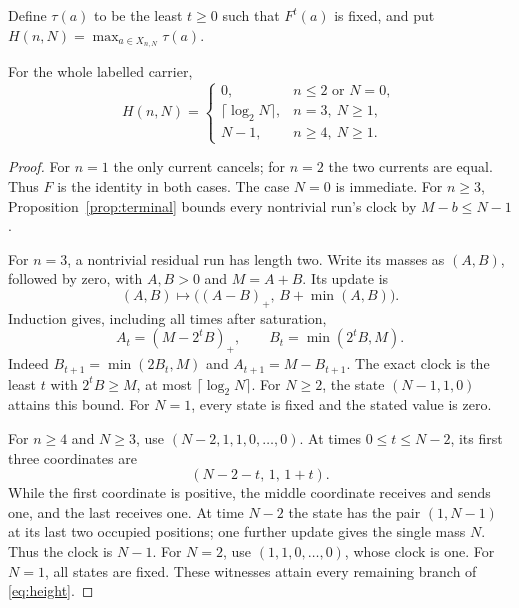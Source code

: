 Define $\tau(a)$ to be the least $t\ge0$ such that $F^t(a)$ is fixed, and
put $H(n,N)=\max_{a\in X_{n,N}}\tau(a)$.

\begin{theorem}\label{thm:clock}
For the whole labelled carrier,
\begin{equation}\label{eq:height}
 H(n,N)=
 \begin{cases}
 0,&n\le2\text{ or }N=0,\\
 \lceil\log_2 N\rceil,&n=3,\ N\ge1,\\
 N-1,&n\ge4,\ N\ge1.
 \end{cases}
\end{equation}
\end{theorem}
\begin{proof}
For $n=1$ the only current cancels; for $n=2$ the two currents are equal.
Thus $F$ is the identity in both cases. The case $N=0$ is immediate.
For $n\ge3$, Proposition~\ref{prop:terminal} bounds every nontrivial run's
clock by $M-b\le N-1$.

For $n=3$, a nontrivial residual run has length two. Write its masses
as $(A,B)$, followed by zero, with $A,B>0$ and $M=A+B$. Its update is
\[
 (A,B)\longmapsto\bigl((A-B)_+,\,B+\min(A,B)\bigr).
\]
Induction gives, including all times after saturation,
\begin{equation}\label{eq:two-site}
 A_t=(M-2^tB)_+,\qquad B_t=\min(2^tB,M).
\end{equation}
Indeed $B_{t+1}=\min(2B_t,M)$ and $A_{t+1}=M-B_{t+1}$.
The exact clock is the least $t$ with $2^tB\ge M$, at most
$\lceil\log_2N\rceil$. For $N\ge2$, the state $(N-1,1,0)$ attains this
bound. For $N=1$, every state is fixed and the stated value is zero.

For $n\ge4$ and $N\ge3$, use $(N-2,1,1,0,\ldots,0)$. At times
$0\le t\le N-2$, its first three coordinates are
\[
 (N-2-t,\,1,\,1+t).
\]
While the first coordinate is positive, the middle coordinate receives
and sends one, and the last receives one. At time $N-2$ the state has
the pair $(1,N-1)$ at its last two occupied positions; one further update
gives the single mass $N$. Thus the clock is $N-1$.
For $N=2$, use $(1,1,0,\ldots,0)$, whose clock is one.
For $N=1$, all states are fixed. These witnesses attain every remaining
branch of \eqref{eq:height}.
\end{proof}


